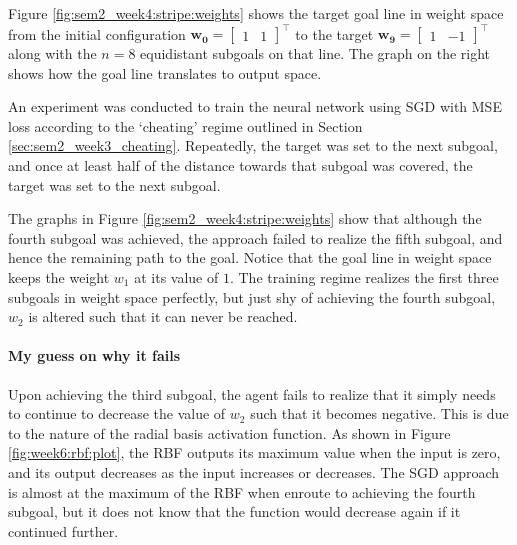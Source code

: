 \documentclass{article}
\renewcommand\vec{\mathbf}
\begin{document}
Figure \ref{fig:sem2_week4:stripe:weights} shows the target goal line in weight space from the initial configuration
$\vec{w_0}=
\begin{bmatrix}
    1 & 1
\end{bmatrix}^\top
$
to the target
$\vec{w_9}=
\begin{bmatrix}
    1 & -1
\end{bmatrix}^\top$
along with the $n=8$ equidistant subgoals on that line.
The graph on the right shows how the goal line translates to output space. 

An experiment was conducted to train the neural network using SGD with MSE loss according to the `cheating' regime outlined in Section \ref{sec:sem2_week3_cheating}. 
Repeatedly, the target was set to the next subgoal, and once at least half of the distance towards that subgoal was covered, the target was set to the next subgoal. 

The graphs in Figure \ref{fig:sem2_week4:stripe:weights} show that although the fourth subgoal was achieved, the approach failed to realize the fifth subgoal, and hence the remaining path to the goal.
Notice that the goal line in weight space keeps the weight $w_1$ at its value of $1$. The training regime realizes the first three subgoals in weight space perfectly, but just shy of achieving the fourth subgoal, $w_2$ is altered such that it can never be reached. 

\paragraph{My guess on why it fails}
Upon achieving the third subgoal, the agent fails to realize that it simply needs to continue to decrease the value of $w_2$ such that it becomes negative. 
This is due to the nature of the radial basis activation function. As shown in Figure \ref{fig:week6:rbf:plot}, the RBF outputs its maximum value when the input is zero, and its output decreases as the input increases or decreases. 
The SGD approach is almost at the maximum of the RBF when enroute to achieving the fourth subgoal, but it does not know that the function would decrease again if it continued further.
\end{document}
